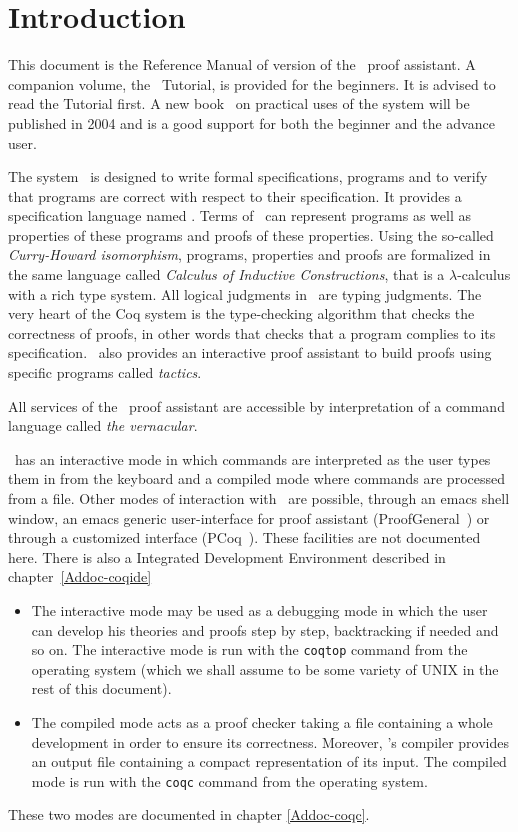 \chapter*{Introduction}

This document is the Reference Manual of version \coqversion{} of the \Coq\ 
proof assistant. A companion volume, the \Coq\ Tutorial, is provided
for the beginners. It is advised to read the Tutorial first.
A new book~\cite{CoqArt} on practical uses of the \Coq{} system will
be published in 2004 and is a good support for both the beginner and
the advance user.

The system \Coq\ is designed to write formal specifications,
programs and to verify that programs are correct with respect to their
specification. It provides a specification language named \gallina. Terms of
\gallina\ can represent programs as well as properties of these
programs and proofs of these properties. Using the so-called
\textit{Curry-Howard isomorphism}, programs, properties and proofs are
formalized in the same 
language called \textit{Calculus of Inductive Constructions}, that is
a $\lambda$-calculus with a rich type system.
All logical judgments in \Coq\ are typing judgments. The very heart of the Coq
system is the type-checking algorithm that checks the correctness of
proofs, in other words that checks that a program complies to its
specification. \Coq\ also provides an interactive proof assistant to
build proofs using specific programs called \textit{tactics}.

All services of the \Coq\ proof assistant are accessible by
interpretation of a command language called \textit{the vernacular}.

\Coq\ has an interactive mode in which commands are interpreted as the
user types them in from the keyboard and a compiled mode where
commands are processed from a file.  Other modes of interaction with
\Coq\ are possible, through an emacs shell window, an emacs generic
user-interface for proof assistant (ProofGeneral~\cite{ProofGeneral}) 
or through a customized interface (PCoq~\cite{Pcoq}). 
These facilities are not documented here.
There is also a \Coq{} Integrated Development Environment described in chapter~\ref{Addoc-coqide}

\begin{itemize}
\item The interactive mode may be used as a debugging mode in which
  the user can develop his theories and proofs step by step,
  backtracking if needed and so on. The interactive mode is run with
  the {\tt coqtop} command from the operating system (which we shall
  assume to be some variety of UNIX in the rest of this document).
\item The compiled mode acts as a proof checker taking a file
  containing a whole development in order to ensure its correctness.
  Moreover, \Coq's compiler provides an output file containing a
  compact representation of its input. The compiled mode is run with
  the {\tt coqc} command from the operating system. 

\end{itemize}
These two modes are documented in chapter \ref{Addoc-coqc}.

